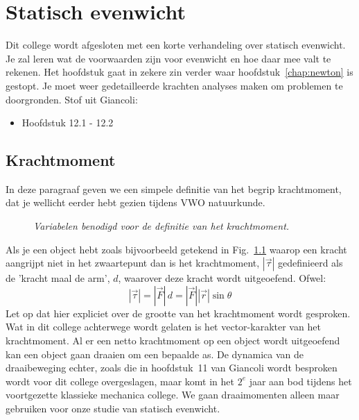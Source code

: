 \chapter{Statisch evenwicht}

Dit college wordt afgesloten met een korte verhandeling over statisch evenwicht. Je zal leren
wat de voorwaarden zijn voor evenwicht en hoe daar mee valt te rekenen. Het hoofdstuk gaat
in zekere zin verder waar hoofdstuk~\ref{chap:newton} is gestopt. Je moet weer gedetailleerde
krachten analyses maken om problemen te doorgronden.
Stof uit Giancoli:
\begin{itemize}
\item Hoofdstuk 12.1 - 12.2
\end{itemize}

\section{Krachtmoment}

In deze paragraaf geven we een simpele definitie van het begrip krachtmoment, dat je
wellicht eerder hebt gezien tijdens VWO natuurkunde. 
 \begin{figure}[htbp]
\begin{center}
\caption{{\it Variabelen benodigd voor de definitie van het krachtmoment.}}
\label{fig:torque}
\end{center}
\end{figure} 
Als je een object hebt zoals
bijvoorbeeld getekend in Fig.~\ref{fig:torque} waarop een kracht aangrijpt niet in het
zwaartepunt dan is het krachtmoment, $|\vec{\tau}|$ gedefinieerd als de 'kracht maal de 
arm', $d$, waarover deze kracht wordt uitgeoefend. Ofwel:
\begin{equation}
|\vec{\tau}| = |\vec{F}|\,d =|\vec{F}||\vec{r}|\sin\theta
\end{equation}
Let op dat hier expliciet over de grootte van het krachtmoment wordt gesproken. Wat in dit
college achterwege wordt gelaten is het vector-karakter van het krachtmoment. Al er een 
netto krachtmoment op een object wordt uitgeoefend kan een object gaan draaien om een 
bepaalde as. De dynamica van de draaibeweging echter, zoals die in hoofdstuk~11 van Giancoli
wordt besproken wordt voor dit college overgeslagen, maar komt in het $2^e$ jaar aan bod
tijdens het voortgezette klassieke mechanica college.  We gaan draaimomenten alleen
maar gebruiken voor onze studie van statisch evenwicht.                  

